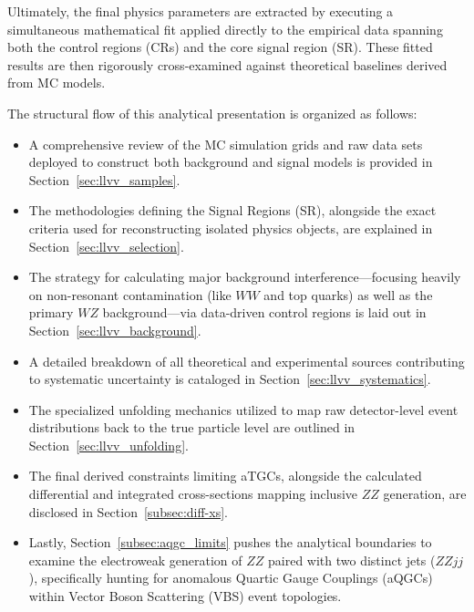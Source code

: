 Ultimately, the final physics parameters are extracted by executing a simultaneous mathematical fit applied directly to the empirical data spanning both the control regions (CRs) and the core signal region (SR). These fitted results are then rigorously cross-examined against theoretical baselines derived from MC models.

The structural flow of this analytical presentation is organized as follows:
\begin{itemize}
    \item A comprehensive review of the MC simulation grids and raw data sets deployed to construct both background and signal models is provided in Section~\ref{sec:llvv_samples}.
    \item The methodologies defining the Signal Regions (SR), alongside the exact criteria used for reconstructing isolated physics objects, are explained in Section~\ref{sec:llvv_selection}.
    \item The strategy for calculating major background interference—focusing heavily on non-resonant contamination (like $WW$ and top quarks) as well as the primary $WZ$ background—via data-driven control regions is laid out in Section~\ref{sec:llvv_background}.
    \item A detailed breakdown of all theoretical and experimental sources contributing to systematic uncertainty is cataloged in Section~\ref{sec:llvv_systematics}.
    \item The specialized unfolding mechanics utilized to map raw detector-level event distributions back to the true particle level are outlined in Section~\ref{sec:llvv_unfolding}.
    \item The final derived constraints limiting aTGCs, alongside the calculated differential and integrated cross-sections mapping inclusive $ZZ$ generation, are disclosed in Section~\ref{subsec:diff-xs}.
    \item Lastly, Section~\ref{subsec:aqgc_limits} pushes the analytical boundaries to examine the electroweak generation of $ZZ$ paired with two distinct jets ($ZZjj$), specifically hunting for anomalous Quartic Gauge Couplings (aQGCs) within Vector Boson Scattering (VBS) event topologies.
\end{itemize}






%

